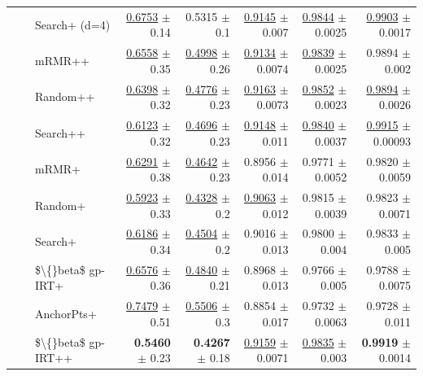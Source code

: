 \begin{longtable}{llp{}rrrrr}
 &  & Search+ (d=4) & \underline{0.6753} {\scriptsize $\pm$ 0.14} & 0.5315 {\scriptsize $\pm$ 0.1} & \underline{0.9145} {\scriptsize $\pm$ 0.007} & \underline{0.9844} {\scriptsize $\pm$ 0.0025} & \underline{0.9903} {\scriptsize $\pm$ 0.0017} \\
 &  & mRMR++ & \underline{0.6558} {\scriptsize $\pm$ 0.35} & \underline{0.4998} {\scriptsize $\pm$ 0.26} & \underline{0.9134} {\scriptsize $\pm$ 0.0074} & \underline{0.9839} {\scriptsize $\pm$ 0.0025} & 0.9894 {\scriptsize $\pm$ 0.002} \\
 &  & Random++ & \underline{0.6398} {\scriptsize $\pm$ 0.32} & \underline{0.4776} {\scriptsize $\pm$ 0.23} & \underline{0.9163} {\scriptsize $\pm$ 0.0073} & \underline{0.9852} {\scriptsize $\pm$ 0.0023} & \underline{0.9894} {\scriptsize $\pm$ 0.0026} \\
 &  & Search++ & \underline{0.6123} {\scriptsize $\pm$ 0.32} & \underline{0.4696} {\scriptsize $\pm$ 0.23} & \underline{0.9148} {\scriptsize $\pm$ 0.011} & \underline{0.9840} {\scriptsize $\pm$ 0.0037} & \underline{0.9915} {\scriptsize $\pm$ 0.00093} \\
 &  & mRMR+ & \underline{0.6291} {\scriptsize $\pm$ 0.38} & \underline{0.4642} {\scriptsize $\pm$ 0.23} & 0.8956 {\scriptsize $\pm$ 0.014} & 0.9771 {\scriptsize $\pm$ 0.0052} & 0.9820 {\scriptsize $\pm$ 0.0059} \\
 &  & Random+ & \underline{0.5923} {\scriptsize $\pm$ 0.33} & \underline{0.4328} {\scriptsize $\pm$ 0.2} & \underline{0.9063} {\scriptsize $\pm$ 0.012} & 0.9815 {\scriptsize $\pm$ 0.0039} & 0.9823 {\scriptsize $\pm$ 0.0071} \\
 &  & Search+ & \underline{0.6186} {\scriptsize $\pm$ 0.34} & \underline{0.4504} {\scriptsize $\pm$ 0.2} & 0.9016 {\scriptsize $\pm$ 0.013} & 0.9800 {\scriptsize $\pm$ 0.004} & 0.9833 {\scriptsize $\pm$ 0.005} \\
 &  & \$\textbackslash\{\}beta\$ gp-IRT+ & \underline{0.6576} {\scriptsize $\pm$ 0.36} & \underline{0.4840} {\scriptsize $\pm$ 0.21} & 0.8968 {\scriptsize $\pm$ 0.013} & 0.9766 {\scriptsize $\pm$ 0.005} & 0.9788 {\scriptsize $\pm$ 0.0075} \\
 &  & AnchorPts+ & \underline{0.7479} {\scriptsize $\pm$ 0.51} & \underline{0.5506} {\scriptsize $\pm$ 0.3} & 0.8854 {\scriptsize $\pm$ 0.017} & 0.9732 {\scriptsize $\pm$ 0.0063} & 0.9728 {\scriptsize $\pm$ 0.011} \\
 &  & \$\textbackslash\{\}beta\$ gp-IRT++ & \textbf{0.5460} {\scriptsize $\pm$ 0.23} & \textbf{0.4267} {\scriptsize $\pm$ 0.18} & \underline{0.9159} {\scriptsize $\pm$ 0.0071} & \underline{0.9835} {\scriptsize $\pm$ 0.003} & \textbf{0.9919} {\scriptsize $\pm$ 0.0014} \\

\end{longtable}

